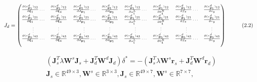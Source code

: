 \documentclass{article}
\begin{document}
\begin{CJK*}{GBK}{song}
\begin{equation}\left.\begin{aligned}
  &
J_d=
{\tiny
\begin{pmatrix}
\frac{\partial{(r^{d}_{\textbf{p}_1})_{12}}}{\partial{\boldsymbol{\xi}_1}}
\ldots
&\frac{\partial{(r^{d}_{\textbf{p}_1})_{12}}}{\partial{\boldsymbol{\xi}_4}}
&\frac{\partial{(r^{d}_{\textbf{p}_1})_{12}}}{\partial{d_{\textbf{p}_1}}}
\ldots
&\frac{\partial{(r^{d}_{\textbf{p}_1})_{12}}}{\partial{d_{\textbf{p}_{5}}}}
&\frac{\partial{(r^{d}_{\textbf{p}_1})_{12}}}{\partial{a^L_1}}
\ldots
&\frac{\partial{(r^{d}_{\textbf{p}_1})_{12}}}{\partial{b^R_4}}
&\frac{\partial{(r^{d}_{\textbf{p}_1})_{12}}}{\partial{f_x}}
\ldots
&\frac{\partial{(r^{d}_{\textbf{p}_1})_{12}}}{\partial{c_y}}
\\
\frac{\partial{(r^{d}_{\textbf{p}_1})_{21}}}{\partial{\boldsymbol{\xi}_1}}
\ldots
&\frac{\partial{(r^{d}_{\textbf{p}_1})_{21}}}{\partial{\boldsymbol{\xi}_4}}
&\frac{\partial{(r^{d}_{\textbf{p}_1})_{21}}}{\partial{d_{\textbf{p}_1}}}
\ldots
&\frac{\partial{(r^{d}_{\textbf{p}_1})_{21}}}{\partial{d_{\textbf{p}_{5}}}}
&\frac{\partial{(r^{d}_{\textbf{p}_1})_{21}}}{\partial{a^L_1}}
\ldots
&\frac{\partial{(r^{d}_{\textbf{p}_1})_{21}}}{\partial{b^R_4}}
&\frac{\partial{(r^{d}_{\textbf{p}_1})_{21}}}{\partial{f_x}}
\ldots
&\frac{\partial{(r^{d}_{\textbf{p}_1})_{21}}}{\partial{c_y}}
\\
\vdots&
\vdots&
\vdots&
\vdots&
\vdots&
\vdots&
\vdots&
\vdots
\\
\frac{\partial{(r^{d}_{\textbf{p}_5})_{43}}}{\partial{\boldsymbol{\xi}_1}}
\ldots
&\frac{\partial{(r^{d}_{\textbf{p}_5})_{43}}}{\partial{\boldsymbol{\xi}_4}}
&\frac{\partial{(r^{d}_{\textbf{p}_5})_{43}}}{\partial{d_{\textbf{p}_1}}}
\ldots
&\frac{\partial{(r^{d}_{\textbf{p}_5})_{43}}}{\partial{d_{\textbf{p}_{5}}}}
&\frac{\partial{(r^{d}_{\textbf{p}_5})_{43}}}{\partial{a^L_1}}
\ldots
&\frac{\partial{(r^{d}_{\textbf{p}_5})_{43}}}{\partial{b^R_4}}
&\frac{\partial{(r^{d}_{\textbf{p}_5})_{43}}}{\partial{f_x}}
\ldots
&\frac{\partial{(r^{d}_{\textbf{p}_5})_{43}}}{\partial{c_y}}
\\&
\end{pmatrix}
}
\end{aligned}\tag{2.2}\right.\end{equation}

\begin{equation}\left.\begin{aligned}
&
(\textbf{J}_s^T \lambda \textbf{W}^s \textbf{J}_s+\textbf{J}_d^T\textbf{W}^d\textbf{J}_d)\delta^\ast=
-(\textbf{J}_s^T \lambda \textbf{W}^s \textbf{r}_s+ \textbf{J}_d^T\textbf{W}^d\textbf{r}_d)
\\&
\textbf{J}_s\in{\mathbb{R}^{49\times{3}}},\textbf{W}^s\in{\mathbb{R}^{3\times{3}}},
\textbf{J}_s\in{\mathbb{R}^{49\times{7}}},\textbf{W}^s\in{\mathbb{R}^{7\times{7}}},
\\
\end{aligned}\tag{2.2}\right.\end{equation}



\end{CJK*}
\end{document}
